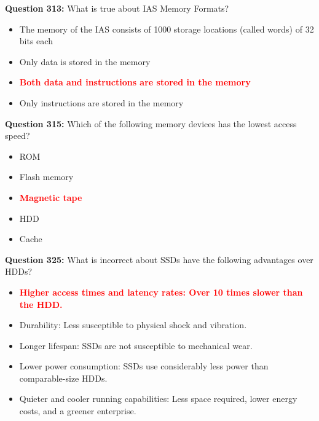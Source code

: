 \documentclass[12pt,a4paper]{article}
\begin{document}
\vspace{0.5cm}

\textbf{Question 313:} What is true about IAS Memory Formats?

\begin{itemize}
    \item[\textbf{A.}] The memory of the IAS consists of 1000 storage locations (called words) of 32 bits each
    \item[\textbf{B.}] Only data is stored in the memory
    \item[\textbf{C.}] \textcolor{red}{\textbf{Both data and instructions are stored in the memory}}
    \item[\textbf{D.}] Only instructions are stored in the memory
\end{itemize}

\vspace{0.5cm}

\textbf{Question 315:} Which of the following memory devices has the lowest access speed?

\begin{itemize}
    \item[\textbf{A.}] ROM
    \item[\textbf{B.}] Flash memory
    \item[\textbf{C.}] \textcolor{red}{\textbf{Magnetic tape}}
    \item[\textbf{D.}] HDD
    \item[\textbf{E.}] Cache
\end{itemize}

\vspace{0.5cm}

\textbf{Question 325:} What is incorrect about SSDs have the following advantages over HDDs?

\begin{itemize}
    \item[\textbf{A.}] \textcolor{red}{\textbf{Higher access times and latency rates: Over 10 times slower than the HDD.}}
    \item[\textbf{B.}] Durability: Less susceptible to physical shock and vibration.
    \item[\textbf{C.}] Longer lifespan: SSDs are not susceptible to mechanical wear.
    \item[\textbf{D.}] Lower power consumption: SSDs use considerably less power than comparable-size HDDs.
    \item[\textbf{E.}] Quieter and cooler running capabilities: Less space required, lower energy costs, and a greener enterprise.
\end{itemize}
\end{document}
